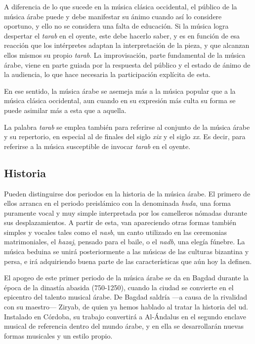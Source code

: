     A diferencia de lo que sucede en la música clásica occidental, el público de la música árabe puede y debe manifestar su ánimo cuando así lo considere oportuno, y ello no se considera una falta de educación. Si la música logra despertar el \emph{tarab} en el oyente, este debe hacerlo saber, y es en función de esa reacción que los intérpretes adaptan la interpretación de la pieza, y que alcanzan ellos mismos su propio \emph{tarab}. La improvisación, parte fundamental de la música árabe, viene en parte guiada por la respuesta del público y el estado de ánimo de la audiencia, lo que hace necesaria la participación explícita de esta.

    En ese sentido, la música árabe se asemeja más a la música popular que a la música clásica occidental, aun cuando en su expresión más culta su forma se puede asimilar más a esta que a aquella.

    La palabra \emph{tarab} se emplea también para referirse al conjunto de la música árabe y su repertorio, en especial al de finales del siglo \emph{xix} y el siglo \emph{xx}. Es decir, para referirse a la música susceptible de invocar \emph{tarab} en el oyente.

    \subsection{Historia}

    Pueden distinguirse dos periodos en la historia de la música árabe. El primero de ellos arranca en el periodo preislámico con la denominada \emph{huda}, una forma puramente vocal y muy simple interpretada por los camelleros nómadas durante sus desplazamientos. A partir de esta, van apareciendo otras formas también simples y vocales tales como el \emph{nasb}, un canto utilizado en las ceremonias matrimoniales, el \emph{hazaj}, pensado para el baile, o el \emph{nadb}, una elegía fúnebre. La música beduina se unirá posteriormente a las músicas de las culturas bizantina y persa, e irá adquiriendo buena parte de las características que aún hoy la definen.

    El apogeo de este primer periodo de la música árabe se da en Bagdad durante la época de la dinastía abasida (750-1250), cuando la ciudad se convierte en el epicentro del talento musical árabe. De Bagdad saldría ---a causa de la rivalidad con su maestro--- Ziryab, de quien ya hemos hablado al tratar la historia del ud. Instalado en Córdoba, su trabajo convertirá a Al-Ándalus en el segundo enclave musical de referencia dentro del mundo árabe, y en ella se desarrollarán nuevas formas musicales y un estilo propio.


